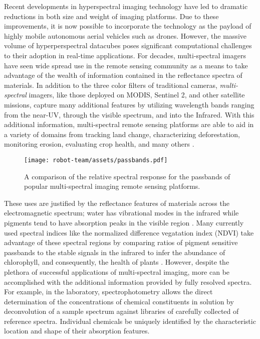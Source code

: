 Recent developments in hyperspectral imaging technology have led to dramatic reductions in both size and weight of imaging platforms. Due to these improvements, it is now possible to incorporate the technology as the payload of highly mobile autonomous aerial vehicles such as drones. However, the massive volume of hyperperspectral datacubes poses significant computational challenges to their adoption in real-time applications. For decades, multi-spectral imagers have seen wide spread use in the remote sensing community as a means to take advantage of the wealth of information contained in the reflectance spectra of materials. In addition to the three color filters of traditional cameras, \textit{multi-spectral} imagers, like those deployed on MODIS, Sentinel 2, and other satellite missions, capture many additional features by utilizing wavelength bands ranging from the near-UV, through the visible spectrum, and into the Infrared. With this additional information, multi-spectral remote sensing platforms are able to aid in a variety of domains from tracking land change, characterizing deforestation, monitoring erosion, evaluating crop health, and many others \cite{remote-sensing-foliage, remote-sensing-applications, crop-indices-2000}.

\begin{figure}[!hbt]
  \centering
  \texttt{[image: robot-team/assets/passbands.pdf]}
  \caption{A comparison of the relative spectral response for the passbands of popular multi-spectral imaging remote sensing platforms.}
  \label{fig:passbands}
\end{figure}

These uses are justified by the reflectance features of materials across the electromagnetic spectrum; water has vibrational modes in the infrared while pigments tend to have absorption peaks in the visible region \cite{absorption-features, mineral-spectra, mineral-spectra-2}. Many currently used spectral indices like the normalized difference vegatation index (NDVI) take advantage of these spectral regions by comparing ratios of pigment sensitive passbands to the stable signals in the infrared to infer the abundance of chlorophyll, and consequently, the health of plants \cite{ndvi-chlorophyll}.  However, despite the plethora of successful applications of multi-spectral imaging, more can be accomplished with the additional information provided by fully resolved spectra. For example, in the laboratory, spectrophotometry allows the direct determination of the concentrations of chemical constituents in solution by deconvolution of a sample spectrum against libraries of carefully collected of reference spectra. Individual chemicals be uniquely identified by the characteristic location and shape of their absorption features.

